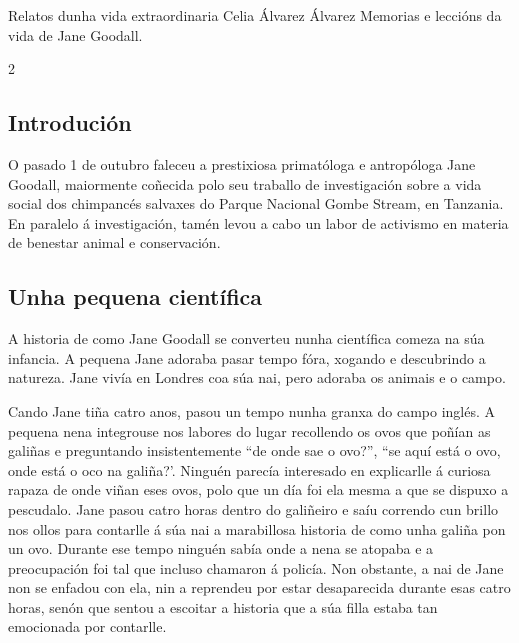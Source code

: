 \Artigo*%
{historia}%
{Relatos dunha vida extraordinaria}%
{Celia Álvarez Álvarez}%
{Memorias e leccións da vida de Jane Goodall.}%

\begin{multicols}{2}

\subsection*{Introdución}

O pasado 1 de outubro faleceu a prestixiosa primatóloga e antropóloga Jane
Goodall, maiormente coñecida polo seu traballo de investigación sobre a vida
social dos chimpancés salvaxes do Parque Nacional Gombe Stream, en Tanzania. En
paralelo á investigación, tamén levou a cabo un labor de activismo en materia
de benestar animal e conservación.

\subsection*{Unha pequena científica}


A historia de como Jane Goodall se converteu nunha científica comeza na súa
infancia. A pequena Jane adoraba pasar tempo fóra, xogando e descubrindo a
natureza. Jane vivía en Londres coa súa nai, pero adoraba os animais e o campo.

Cando Jane tiña catro anos, pasou un tempo nunha granxa do campo
inglés. A pequena nena integrouse nos labores do lugar recollendo os ovos que
poñían as galiñas e preguntando insistentemente ``de onde sae o ovo?'', ``se aquí
está o ovo, onde está o oco na galiña?'. Ninguén parecía interesado en
explicarlle á curiosa rapaza de onde viñan eses ovos, polo que un día foi ela
mesma a que se dispuxo a pescudalo. Jane pasou catro horas dentro do galiñeiro
e saíu correndo cun brillo nos ollos para contarlle á súa nai a marabillosa
historia de como unha galiña pon un ovo. Durante ese tempo ninguén sabía onde
a nena se atopaba e a preocupación foi tal que incluso chamaron á policía.
Non obstante, a nai de Jane non se enfadou con ela, nin a reprendeu por estar
desaparecida durante esas catro horas, senón que sentou a escoitar a historia
que a súa filla estaba tan emocionada por contarlle.


\end{multicols}
